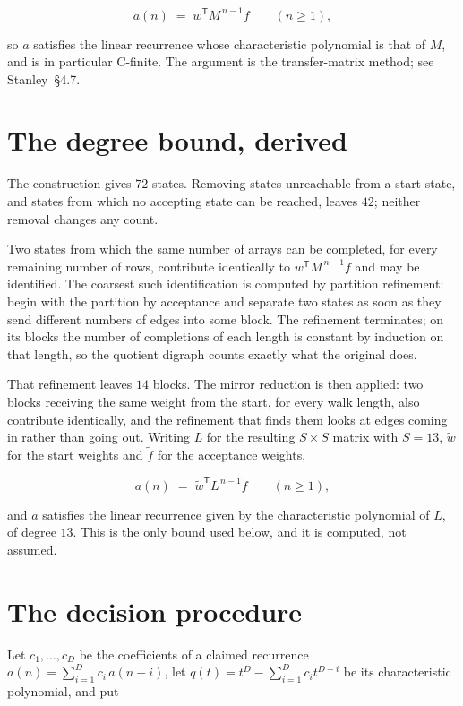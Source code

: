 \documentclass[11pt]{article}
\theoremstyle{definition}
\begin{document}
\[a(n) \;=\; w^{\mathsf T} M^{\,n-1} f \qquad (n \ge 1),\]

so $a$ satisfies the linear recurrence whose characteristic polynomial is that of $M$, and is in particular C-finite. The argument is the transfer-matrix method; see Stanley~\S4.7.

\section{The degree bound, derived}

The construction gives $72$ states. Removing states unreachable from a start state, and states from which no accepting state can be reached, leaves $42$; neither removal changes any count.

Two states from which the same number of arrays can be completed, for every remaining number of rows, contribute identically to $w^{\mathsf T}M^{\,n-1}f$ and may be identified. The coarsest such identification is computed by partition refinement: begin with the partition by acceptance and separate two states as soon as they send different numbers of edges into some block. The refinement terminates; on its blocks the number of completions of each length is constant by induction on that length, so the quotient digraph counts exactly what the original does.

That refinement leaves $14$ blocks. The mirror reduction is then applied: two blocks receiving the same weight from the start, for every walk length, also contribute identically, and the refinement that finds them looks at edges coming in rather than going out. Writing $L$ for the resulting $S \times S$ matrix with $S = 13$, $\tilde w$ for the start weights and $\tilde f$ for the acceptance weights,

\[a(n) \;=\; \tilde w^{\mathsf T} L^{\,n-1} \tilde f \qquad (n \ge 1),\]

and $a$ satisfies the linear recurrence given by the characteristic polynomial of $L$, of degree $13$. This is the only bound used below, and it is computed, not assumed.

\section{The decision procedure}

Let $c_1,\dots,c_D$ be the coefficients of a claimed recurrence $a(n) = \sum_{i=1}^{D} c_i\,a(n-i)$, let $q(t) = t^{D} - \sum_{i=1}^{D} c_i t^{D-i}$ be its characteristic polynomial, and put
\end{document}
